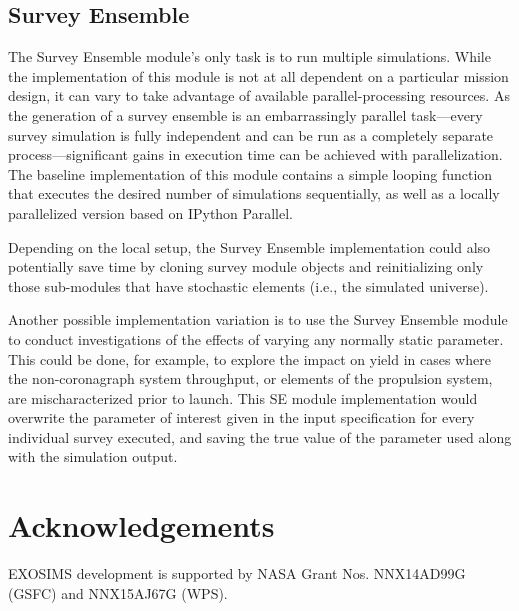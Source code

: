 \documentclass[cleanfoot]{asme2ej}
\begin{document}

\subsection{Survey Ensemble}
The Survey Ensemble module's only task is to run multiple simulations.  While the implementation of this module is not at all dependent on a particular mission design, it can vary to take advantage of available parallel-processing resources.  As the generation of a survey ensemble is an embarrassingly parallel task---every survey simulation is fully independent and can be run as a completely separate process---significant gains in execution time can be achieved with parallelization.  The baseline implementation of this module contains a simple looping function that executes the desired number of simulations sequentially, as well as a locally parallelized version based on IPython Parallel.

Depending on the local setup, the Survey Ensemble implementation could also potentially save time by cloning survey module objects and reinitializing only those sub-modules that have stochastic elements (i.e., the simulated universe).

Another possible implementation variation is to use the Survey Ensemble module to conduct investigations of the effects of varying any normally static parameter.  This could be done, for example, to explore the impact on yield in cases where the non-coronagraph system throughput, or elements of the propulsion system, are mischaracterized prior to launch.  This SE module implementation would overwrite the parameter of interest given in the input specification for every individual survey executed, and saving the true value of the parameter used along with the simulation output.


\section*{Acknowledgements}  EXOSIMS development is supported by NASA Grant Nos. NNX14AD99G (GSFC) and NNX15AJ67G (WPS).
\end{document}
